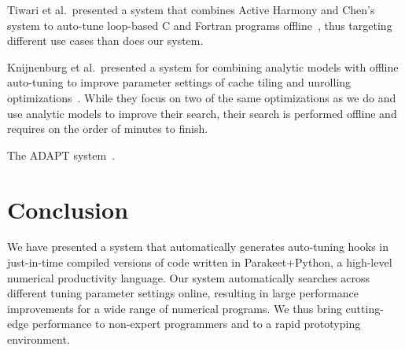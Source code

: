 \documentclass[preprint,9pt]{sigplanconf}
\begin{document}
Tiwari et al.~presented a system that combines Active Harmony and Chen's system to auto-tune loop-based C and Fortran programs offline~\cite{Tiwa09}, thus targeting different use cases than does our system.

Knijnenburg et al.~presented a system for combining analytic models with offline auto-tuning to improve parameter settings of cache tiling and unrolling optimizations~\cite{Knij04}.  While they focus on two of the same optimizations as we do and use analytic models to improve their search, their search is performed offline and requires on the order of minutes to finish.

The ADAPT system~\cite{Voss99}.

\section{Conclusion}
\label{conclusion}
We have presented a system that automatically generates auto-tuning hooks in just-in-time compiled versions of code written in Parakeet+Python, a high-level numerical productivity language.  Our system automatically searches across different tuning parameter settings online, resulting in large performance improvements for a wide range of numerical programs.  We thus bring cutting-edge performance to non-expert programmers and to a rapid prototyping environment.






{}




\end{document}
